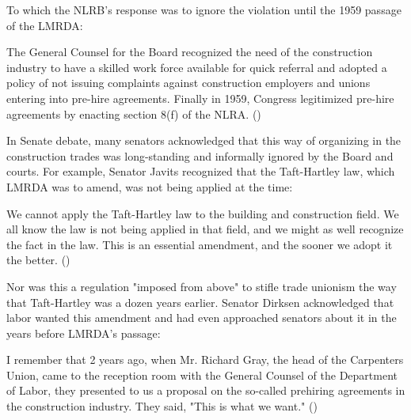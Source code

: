 \documentclass[12pt]{article}
\renewenvironment{quote}
  {\list{}{\leftmargin=\parindent\rightmargin=0pt}%
   \item\relax}
  {\endlist}
\begin{document}
To which the NLRB’s response was to ignore the violation until the 1959 passage of the LMRDA:

\begin{quote}
The General Counsel for the Board recognized the need of the construction industry to have a skilled work force available for quick referral and adopted a policy of not issuing complaints against construction employers and unions entering into pre-hire agreements. Finally in 1959, Congress legitimized pre-hire agreements by enacting section 8(f) of the NLRA. (\cite[1017]{murphyPreHireAgreementsSection1982})
\end{quote}

In Senate debate, many senators acknowledged that this way of organizing in the construction trades was long-standing and informally ignored by the Board and courts. For example, Senator Javits recognized that the Taft-Hartley law, which LMRDA was to amend, was not being applied at the time:

\begin{quote}
We cannot apply the Taft-Hartley law to the building and construction field. We all know the law is not being applied in that field, and we might as well recognize the fact in the law. This is an essential amendment, and the sooner we adopt it the better. (\cite[6395]{105CongressionalRecord1959})
\end{quote}

Nor was this a regulation "imposed from above" to stifle trade unionism the way that Taft-Hartley was a dozen years earlier. Senator Dirksen acknowledged that labor wanted this amendment and had even approached senators about it in the years before LMRDA’s passage:

\begin{quote}
I remember that 2 years ago, when Mr. Richard Gray, the head of the Carpenters Union, came to the reception room with the General Counsel of the Department of Labor, they presented to us a proposal on the so-called prehiring agreements in the construction industry. They said, "This is what we want." (\cite[6414]{105CongressionalRecord1959})
\end{quote}

\end{document}
